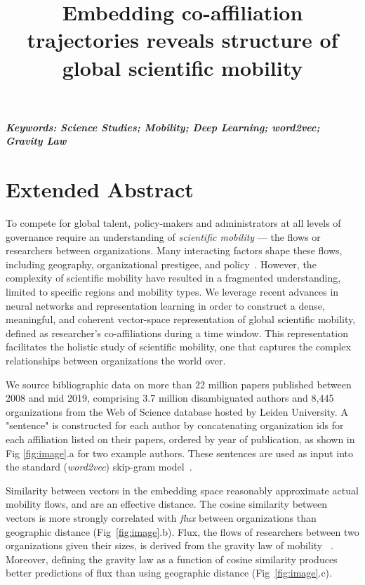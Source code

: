 \documentclass[a4paper,12pt]{article}
\title{Embedding co-affiliation trajectories reveals structure of global scientific mobility}
\author[]{} %
\date{}
\begin{document}
\maketitle
\thispagestyle{fancy}

\vspace{-6em}
\begin{center}
\textbf{\textit{Keywords: Science Studies; Mobility; Deep Learning; word2vec; Gravity Law }}
\newline
\end{center}

\section*{Extended Abstract}
To compete for global talent, policy-makers and administrators at all levels of governance require an understanding of \textit{scientific mobility} — the flows or researchers between organizations. 
Many interacting factors shape these flows, including geography, organizational prestigee, and policy~\autocite{deville_career_2014, clauset_systematic_2015}.
However, the complexity of scientific mobility have resulted in a fragmented understanding, limited to specific regions and mobility types.
We leverage recent advances in neural networks and representation learning in order to construct a dense, meaningful, and coherent vector-space representation of global scientific mobility, defined as researcher's co-affiliations during a time window. 
This representation facilitates the holistic study of scientific mobility, one that captures the complex relationships between organizations the world over. 

We source bibliographic data on more than 22 million papers published between 2008 and mid 2019, comprising 3.7 million disambiguated authors and 8,445 organizations from the Web of Science database hosted by Leiden University. 
A "sentence" is constructed for each author by concatenating organization ids for each affiliation listed on their papers, ordered by year of publication, as shown in Fig \ref{fig:image}.a for two example authors. 
These sentences are used as input into the standard (\textit{word2vec}) skip-gram model~\autocite{mikolov_distributed_2013}. 

Similarity between vectors in the embedding space reasonably approximate actual mobility flows, and are an effective distance. 
The cosine similarity between vectors is more strongly correlated with \textit{flux} between organizations than geographic distance (Fig~\ref{fig:image}.b). 
Flux, the flows of researchers between two organizations given their sizes, is derived from the gravity law of mobility ~\autocite{simini_universal_2012}.
Moreover, defining the gravity law as a function of cosine similarity produces better predictions of flux than using geographic distance (Fig~\ref{fig:image}.c). 
\end{document}
